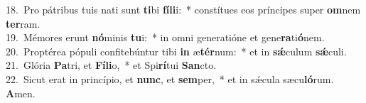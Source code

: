{18.~}Pro pátribus tuis nati sunt \textbf{ti}bi \textbf{fí}\textbf{li}i:~* constítues eos príncipes super \textbf{om}nem \textbf{ter}ram.\\
{19.~}Mémores erunt \textbf{nó}minis \textbf{tu}i:~* in omni generatióne et gene\textbf{ra}ti\textbf{ó}nem.\\
{20.~}Proptérea pópuli confitebúntur tibi \textbf{in} æ\textbf{tér}num:~* et in \textbf{sǽ}culum \textbf{sǽ}culi.\\
{21.~}Glória \textbf{Pa}tri, et \textbf{Fí}\textbf{li}o,~* et Spi\textbf{rí}tui \textbf{San}cto.\\
{22.~}Sicut erat in princípio, et \textbf{nunc}, et \textbf{sem}per,~* et in sǽcula sæcu\textbf{ló}rum. \textbf{A}men.\\

